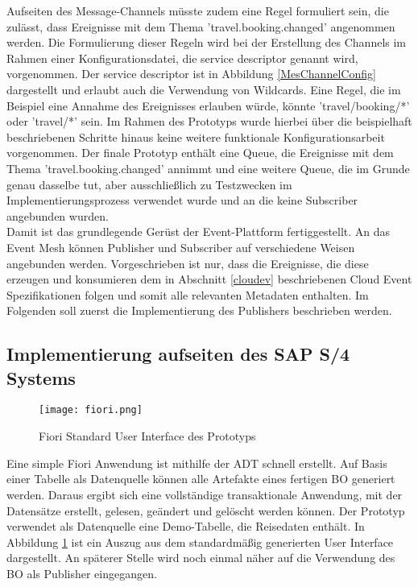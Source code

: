   Aufseiten des Message-Channels müsste zudem eine Regel formuliert sein, die zulässt, dass Ereignisse mit dem Thema 'travel.booking.changed' angenommen werden. Die Formulierung dieser Regeln wird bei der Erstellung des Channels im Rahmen einer Konfigurationsdatei, die service descriptor genannt wird, vorgenommen. Der service descriptor ist in Abbildung \ref{MesChannelConfig} dargestellt und erlaubt auch die Verwendung von Wildcards. Eine Regel, die im Beispiel eine Annahme des Ereignisses erlauben würde, könnte 'travel/booking/*' oder 'travel/*' sein. Im Rahmen des Prototyps wurde hierbei über die beispielhaft beschriebenen Schritte hinaus keine weitere funktionale Konfigurationsarbeit vorgenommen. Der finale Prototyp enthält eine Queue, die Ereignisse mit dem Thema 'travel.booking.changed' annimmt und eine weitere Queue, die im Grunde genau dasselbe tut, aber ausschließlich zu Testzwecken im Implementierungsprozess verwendet wurde und an die keine Subscriber angebunden wurden.\\

  Damit ist das grundlegende Gerüst der Event-Plattform fertiggestellt. An das Event Mesh können Publisher und Subscriber auf verschiedene Weisen angebunden werden. Vorgeschrieben ist nur, dass die Ereignisse, die diese erzeugen und konsumieren dem in Abschnitt \ref{cloudev} beschriebenen Cloud Event Spezifikationen folgen und somit alle relevanten Metadaten enthalten. Im Folgenden soll zuerst die Implementierung des Publishers beschrieben werden.\\

  \subsection{Implementierung aufseiten des SAP S/4 Systems}
  \begin{figure}
    \centering
    \texttt{[image: fiori.png]}
    \caption[Screenshot des Prototyps]{Fiori Standard User Interface des Prototyps \footnotemark}
    \label{fiori}
  \end{figure}
  Eine simple Fiori Anwendung ist mithilfe der \ac{ADT} schnell erstellt. Auf Basis einer Tabelle als Datenquelle können alle Artefakte eines fertigen \ac{BO} generiert werden. Daraus ergibt sich eine vollständige transaktionale Anwendung, mit der Datensätze erstellt, gelesen, geändert und gelöscht werden können. Der Prototyp verwendet als Datenquelle eine Demo-Tabelle, die Reisedaten enthält. In Abbildung \ref{fiori} ist ein Auszug aus dem standardmäßig generierten User Interface dargestellt. An späterer Stelle wird noch einmal näher auf die Verwendung des \ac{BO} als Publisher eingegangen.\\

